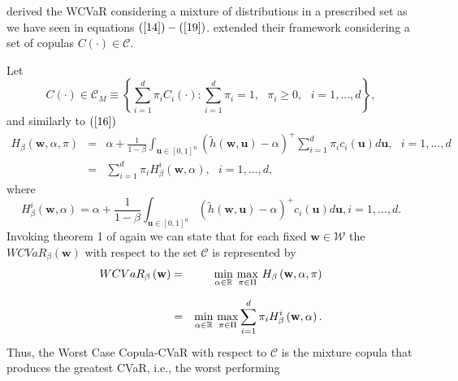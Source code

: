 \documentclass[a4paper,10pt]{article}
\begin{document}
\citet*{zhu2009worst} derived the WCVaR considering a mixture of
distributions in a prescribed set as we have seen in equations $\left( \ref%
{14}\right) -\left( \ref{19}\right) $. \citet*{kakouris14} extended their
framework considering a set of copulas $C\left( \cdot \right) \in \mathcal{C}
$.

Let
\begin{equation}
C\left( \cdot \right) \in \mathcal{C}_{M}\equiv \left\{ \sum_{i=1}^{d}\pi
_{i}C_{i}\left( \cdot \right) :\sum_{i=1}^{d}\pi _{i}=1,\text{ }\pi _{i}\geq
0,\text{ }i=1,...,d\right\} ,  \label{28}
\end{equation}%
and similarly to $\left( \ref{16}\right) $
\begin{eqnarray}
H_{\beta }\left( \mathbf{w},\alpha ,\pi \right) &=&\alpha +\frac{1}{1-\beta }%
\int_{\mathbf{u}\in \left[ 0,1\right] ^{n}}\left( \widetilde{h}\left( \mathbf{w,u}%
\right) -\alpha \right) ^{+}\sum_{i=1}^{d}\pi _{i}c_{i}\left( \mathbf{u}%
\right) d\mathbf{u},\text{ }i=1,...,d  \label{28b} \\
&=&\sum_{i=1}^{d}\pi _{i}H_{\beta }^{i}\left( \mathbf{w},\alpha \right) ,%
\text{ }i=1,...,d,  \label{29}
\end{eqnarray}%
where%
\begin{equation}
H_{\beta }^{i}\left( \mathbf{w},\alpha \right) =\alpha +\frac{1}{1-\beta }%
\int_{\mathbf{u}\in \left[ 0,1\right] ^{n}}\left( \widetilde{h}\left( \mathbf{w,u}%
\right) -\alpha \right) ^{+}c_{i}\left( \mathbf{u}\right) d\mathbf{u},\text{
}i=1,...,d.  \label{30}
\end{equation}%
Invoking theorem 1 of \citet*{zhu2009worst} again we can state that for each
fixed $\mathbf{w}\in \mathcal{W}$ the $WCVaR_{\beta }\left( \mathbf{w}%
\right) $ with respect to the set $\mathcal{C}$ is represented by
\begin{eqnarray}
WCVaR_{\beta }\left( \mathbf{w}\right) &=&\underset{}{\underset{\alpha \in
		\mathbb{R}
	}{\min }~\underset{\pi \in \Pi }{\max }}~H_{\beta }\left( \mathbf{w},\alpha
,\pi \right)  \notag \\
&=&\underset{}{\underset{\alpha \in
		\mathbb{R}
	}{\min }~\underset{\pi \in \Pi }{\max }}\sum_{i=1}^{d}\pi _{i}H_{\beta
}^{i}\left( \mathbf{w},\alpha \right) .  \label{31}
\end{eqnarray}%
Thus, the Worst Case Copula-CVaR with respect to $\mathcal{C}$ is the
mixture copula that produces the greatest CVaR, i.e., the worst performing
\end{document}
